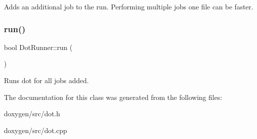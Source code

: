 Adds an additional job to the run. Performing multiple jobs one file can be faster. \mbox{\label{class_dot_runner_ac1afaee16ddd8bf0bc6b18aaed6b44fd}} 
\subsubsection{\texorpdfstring{run()}{run()}}
{\footnotesize\ttfamily bool Dot\+Runner\+::run (\begin{DoxyParamCaption}{ }\end{DoxyParamCaption})}

Runs dot for all jobs added. 

The documentation for this class was generated from the following files\+:\begin{DoxyCompactItemize}
\item 
doxygen/src/dot.\+h\item 
doxygen/src/dot.\+cpp\end{DoxyCompactItemize}
